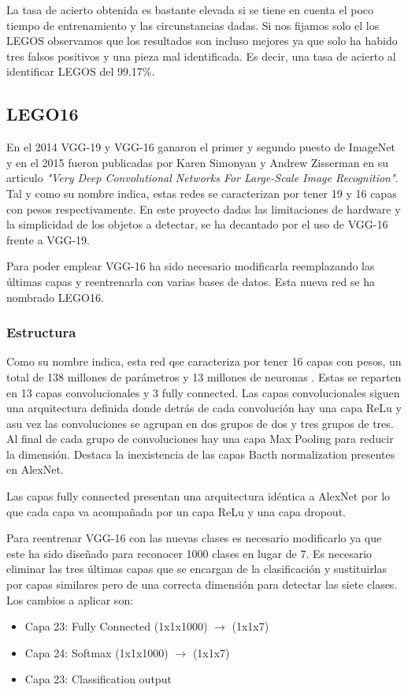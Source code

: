 La tasa de acierto obtenida es bastante elevada si se tiene en cuenta el poco tiempo de entrenamiento y las circunstancias dadas. Si nos fijamos solo el los LEGOS observamos que los resultados son incluso mejores ya que solo ha habido tres falsos positivos y una pieza mal identificada. Es decir, una tasa de acierto al identificar LEGOS del 99.17\%.

\subsection{LEGO16}
En el 2014 VGG-19 y VGG-16 ganaron el primer y segundo puesto de ImageNet y en el 2015 fueron publicadas por Karen Simonyan y Andrew Zisserman en su articulo \textit{"Very Deep Convolutional Networks For Large-Scale Image Recognition"}\cite{VGG16}. Tal y como su nombre indica, estas redes se caracterizan por tener 19 y 16 capas con pesos respectivamente. En este proyecto dadas las limitaciones de hardware y la simplicidad de los objetos a detectar, se ha decantado por el uso de VGG-16 frente a VGG-19.

Para poder emplear VGG-16 ha sido necesario modificarla reemplazando las últimas capas y reentrenarla con varias bases de datos. Esta nueva red se ha nombrado LEGO16.

\subsubsection*{Estructura}
Como su nombre indica, esta red qse caracteriza por tener 16 capas con pesos, un total de 138 millones de parámetros y 13 millones de neuronas . Estas se reparten en 13 capas convolucionales y 3 fully connected. Las capas convolucionales siguen una arquitectura definida donde detrás de cada convolución hay una capa ReLu y asu vez las convoluciones se agrupan en dos grupos de dos y tres grupos de tres. Al final de cada grupo de convoluciones hay una capa Max Pooling para reducir la dimensión. Destaca la inexistencia de las capas Bacth normalization presentes en AlexNet.

Las capas fully connected presentan una arquitectura idéntica a AlexNet por lo que cada capa va acompañada por un capa ReLu y una capa dropout.

Para reentrenar VGG-16 con las nuevas clases es necesario modificarlo ya que este ha sido diseñado para reconocer 1000 clases en lugar de 7. Es necesario eliminar las tres últimas capas que se encargan de la clasificación y sustituirlas por capas similares pero de una correcta dimensión para detectar las siete clases. Los cambios a aplicar son:
\begin{itemize}
\item Capa 23: Fully Connected (1x1x1000) $\rightarrow$ (1x1x7)
\item Capa 24: Softmax (1x1x1000) $\rightarrow$ (1x1x7)
\item Capa 23: Classification output
\end{itemize}


